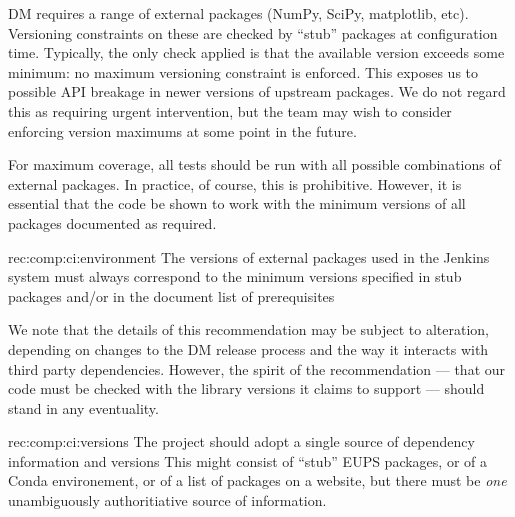 DM requires a range of external packages (NumPy, SciPy, matplotlib, etc).
Versioning constraints on these are checked by ``stub'' packages at configuration time.
Typically, the only check applied is that the available version exceeds some minimum: no maximum versioning constraint is enforced.
This exposes us to possible API breakage in newer versions of upstream packages.
We do not regard this as requiring urgent intervention, but the team may wish to consider enforcing version maximums at some point in the future.

For maximum coverage, all tests should be run with all possible combinations of external packages.
In practice, of course, this is prohibitive.
However, it is essential that the code be shown to work with the minimum versions of all packages documented as required.

\begin{recommendation}
    {rec:comp:ci:environment}
    {The versions of external packages used in the Jenkins system must always correspond to the minimum versions specified in stub packages and/or in the document list of prerequisites}
\end{recommendation}

We note that the details of this recommendation may be subject to alteration, depending on changes to the DM release process and the way it interacts with third party dependencies.
However, the spirit of the recommendation --- that our code must be checked with the library versions it claims to support --- should stand in any eventuality.

\begin{recommendation}
    {rec:comp:ci:versions}
    {The project should adopt a single source of dependency information and versions}
This might consist of ``stub'' EUPS packages, or of a Conda environement, or of a list of packages on a website, but there must be \emph{one} unambiguously authoritiative source of information.
\end{recommendation}
